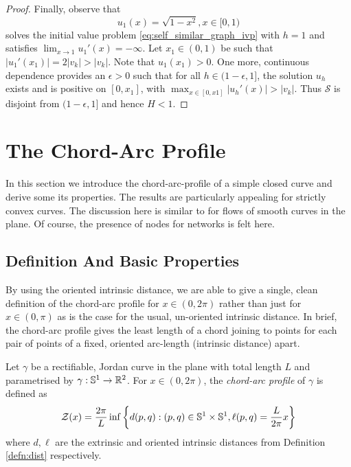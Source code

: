 \documentclass[11pt]{amsart}
\begin{document}
\begin{proof}
Finally, observe that
\[
u_1(x) = \sqrt{1 - x^2}, x \in [0, 1)
\]
solves the initial value problem \eqref{eq:self_similar_graph_ivp} with \(h = 1\) and satisfies \(\lim_{x\to 1} u_1'(x) = -\infty\). Let \(x_1 \in (0, 1)\) be such that \(|u_1'(x_1)| = 2|v_k| > |v_k|\). Note that \(u_1(x_1) > 0\). One more, continuous dependence provides an \(\epsilon > 0\) such that for all \(h \in (1 - \epsilon, 1]\), the solution \(u_h\) exists and is positive on \([0, x_1]\), with \(\max_{x \in [0, x1]} |u_h'(x)| > |v_k|\). Thus \(\mathcal{S}\) is disjoint from \((1- \epsilon, 1]\) and hence \(H < 1\).
\end{proof}

\section{The Chord-Arc Profile}
\label{sec:orgheadline10}

In this section we introduce the chord-arc-profile of a simple closed curve and derive some its properties. The results are particularly appealing for strictly convex curves. The discussion here is similar to \cite{alpha_csf_dist_comp} for flows of smooth curves in the plane. Of course, the presence of nodes for networks is felt here.

\subsection{Definition And Basic Properties}
\label{sec:orgheadline7}

By using the oriented intrinsic distance, we are able to give a single, clean definition of the chord-arc profile for \(x \in (0, 2\pi)\) rather than just for \(x \in (0, \pi)\) as is the case for the usual, un-oriented intrinsic distance. In brief, the chord-arc profile gives the least length of a chord joining to points for each pair of points of a fixed, oriented arc-length (intrinsic distance) apart.

\begin{defn}
Let \(\gamma\) be a rectifiable, Jordan curve in the plane with total length \(L\) and parametrised by \(\gamma: \mathbb{S}^1 \to \mathbb{R}^2\). For \(x\in (0, 2\pi)\), the \emph{chord-arc profile} of \(\gamma\) is defined as
\[
\operatorname{\mathcal{Z}} (x) = \frac{2\pi}{L} \inf\left\{d(p, q): (p,q) \in \mathbb{S}^1\times\mathbb{S}^1, \ell(p,q) = \frac{L}{2\pi} x\right\}
\]
where \(d, \ell\) are the extrinsic and oriented intrinsic distances from Definition \ref{defn:dist} respectively.
\end{defn}
\end{document}
